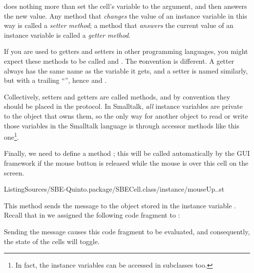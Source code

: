 \documentclass[a4paper,10pt,twoside]{book}
\begin{document}
 does nothing more than set the cell's  variable to the argument, and then answers the new value.
Any method that \emph{changes} the value of an instance variable in this way is called a \emph{setter method}; a method that \emph{answers} the current value of an instance variable is called a \emph{getter method}.

If you are used to getters and setters in other programming languages, you might expect these methods to be called  and .
The \st convention is different.
A getter always has the same name as the variable it gets, and a setter is named similarly, but with a trailing ``\ct{:}'', hence  and .

Collectively, setters and getters are called  methods, and by convention they should be placed in the  protocol.
In Smalltalk, \emph{all} instance variables are private to the object that owns them, so the only way for another object to read or write those variables in the Smalltalk language is through accessor methods like this one\footnote{%
	In fact, the instance variables can be accessed in subclasses too.%
}.


Finally, we need to define a method ; this will be called automatically by the GUI framework if the mouse button is released while the mouse is over this cell on the screen.

%
{ListingSources/SBE-Quinto.package/SBECell.class/instance/mouseUp..st}


This method sends the message  to the object stored in the instance variable . 
Recall that in  we assigned the following code fragment to :


\noindent
Sending the  message causes this code fragment to be evaluated, and consequently, the state of the cells will toggle.
\end{document}
